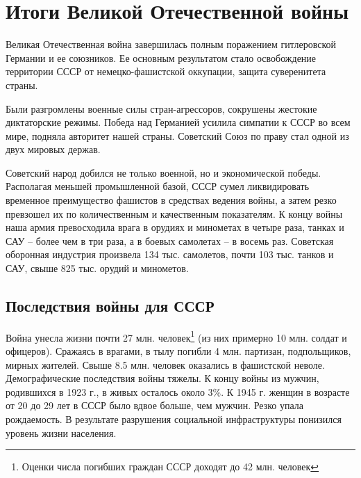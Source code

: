 \documentclass[12pt]{article}
\newcommand{\red}[1]{{\color{red}{#1}}}
\begin{document}
  \setcounter{section}{4}
  \section{Итоги Великой Отечественной войны}
  Великая Отечественная война завершилась полным поражением гитлеровской Германии и ее союзников.
  Ее основным результатом стало освобождение территории СССР от немецко-фашистской оккупации,
  защита суверенитета страны.
  \red{
    СССР и его доблестная армия избавили весь мир от угрозы фашизма.
    Результаты войны показали высокую боевую мощь Красной Армии и Военно-Морского Флота.
    Высокую оценку Красной Армии дал генерал Д. Эйзенхауэр, командующий англо-американскими войсками в Европе,
    а позже -- президент США: <<великие подвиги Красной Армии во время войны в Европе вызвали восхищение всего мира.
    Как солдат, наблюдавший кампанию Красной Армии, я проникся глубочайшим восхищением мастерством ее руководителей>>.
  }

  Были разгромлены военные силы стран-агрессоров, сокрушены жестокие диктаторские режимы.
  Победа над Германией усилила симпатии к СССР во всем мире, подняла авторитет нашей страны.
  Советский Союз по праву стал одной из двух мировых держав.

  Советский народ добился не только военной, но и экономической победы.
  Располагая меньшей промышленной базой, СССР сумел ликвидировать временное преимущество фашистов в средствах ведения войны,
  а затем резко превзошел их по количественным и качественным показателям.
  К концу войны наша армия превосходила врага в орудиях и минометах в четыре раза,
  танках и САУ -- более чем в три раза, а в боевых самолетах -- в восемь раз.
  Советская оборонная индустрия произвела 134 тыс. самолетов, почти 103 тыс. танков и САУ,
  свыше 825 тыс. орудий и минометов.
  \red{
    В этом величайшая заслуга тружеников советского тыла.
    Сплав героизма ратного и трудового -- основной фактор Победы.
  }

  \subsection{Последствия войны для СССР}
  \red{Советский народ дорого заплатил за Победу.}
  Война унесла жизни почти 27 млн. человек\footnote{Оценки числа погибших граждан СССР доходят до 42 млн. человек} (из них примерно 10 млн. солдат и офицеров).
  Сражаясь в врагами, в тылу погибли 4 млн. партизан, подпольщиков, мирных жителей.
  Свыше 8.5 млн. человек оказались в фашистской неволе.
  Демографические последствия войны тяжелы.
  К концу войны из мужчин, родившихся в 1923 г., в живых осталось около 3\%.
  К 1945 г. женщин в возрасте от 20 до 29 лет в СССР было вдвое больше, чем мужчин.
  Резко упала рождаемость.
  В результате разрушения социальной инфраструктуры понизился уровень жизни населения.
\end{document}

